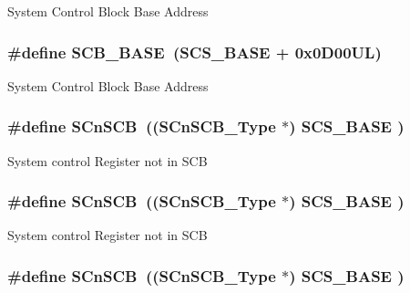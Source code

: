 System Control Block Base Address \hypertarget{group___c_m_s_i_s__core__base_gad55a7ddb8d4b2398b0c1cfec76c0d9fd}{
\subsubsection[{S\-C\-B\-\_\-\-B\-A\-S\-E}]{\setlength{\rightskip}{0pt plus 5cm}\#define S\-C\-B\-\_\-\-B\-A\-S\-E~({\bf S\-C\-S\-\_\-\-B\-A\-S\-E} +  0x0\-D00\-U\-L)}}\label{group___c_m_s_i_s__core__base_gad55a7ddb8d4b2398b0c1cfec76c0d9fd}
System Control Block Base Address \hypertarget{group___c_m_s_i_s__core__base_ga9fe0cd2eef83a8adad94490d9ecca63f}{
\subsubsection[{S\-Cn\-S\-C\-B}]{\setlength{\rightskip}{0pt plus 5cm}\#define S\-Cn\-S\-C\-B~(({\bf S\-Cn\-S\-C\-B\-\_\-\-Type}    $\ast$)     {\bf S\-C\-S\-\_\-\-B\-A\-S\-E}      )}}\label{group___c_m_s_i_s__core__base_ga9fe0cd2eef83a8adad94490d9ecca63f}
System control Register not in S\-C\-B \hypertarget{group___c_m_s_i_s__core__base_ga9fe0cd2eef83a8adad94490d9ecca63f}{
\subsubsection[{S\-Cn\-S\-C\-B}]{\setlength{\rightskip}{0pt plus 5cm}\#define S\-Cn\-S\-C\-B~(({\bf S\-Cn\-S\-C\-B\-\_\-\-Type}    $\ast$)     {\bf S\-C\-S\-\_\-\-B\-A\-S\-E}      )}}\label{group___c_m_s_i_s__core__base_ga9fe0cd2eef83a8adad94490d9ecca63f}
System control Register not in S\-C\-B \hypertarget{group___c_m_s_i_s__core__base_ga9fe0cd2eef83a8adad94490d9ecca63f}{
\subsubsection[{S\-Cn\-S\-C\-B}]{\setlength{\rightskip}{0pt plus 5cm}\#define S\-Cn\-S\-C\-B~(({\bf S\-Cn\-S\-C\-B\-\_\-\-Type}    $\ast$)     {\bf S\-C\-S\-\_\-\-B\-A\-S\-E}      )}}\label{group___c_m_s_i_s__core__base_ga9fe0cd2eef83a8adad94490d9ecca63f}
